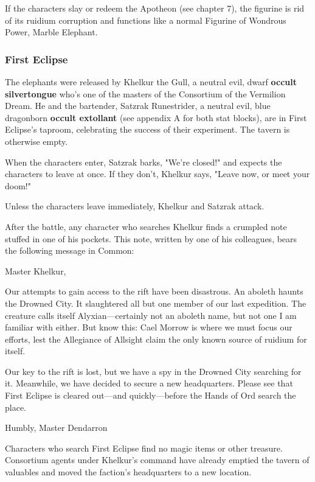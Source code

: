 \documentclass[10pt,a4paper,twoside,fancy,bg=print,twocolumn,openany,nodeprecatedcode]{dndbook}
\begin{document}
If the characters slay or redeem the Apotheon (see chapter 7), the figurine is rid of its ruidium corruption and functions like a normal Figurine of Wondrous Power, Marble Elephant.

\subsubsection{First Eclipse}
The elephants were released by Khelkur the Gull, a neutral evil, dwarf \textbf{occult silvertongue} who's one of the masters of the Consortium of the Vermilion Dream. He and the bartender, Satzrak Runestrider, a neutral evil, blue dragonborn \textbf{occult extollant} (see appendix A for both stat blocks), are in First Eclipse's taproom, celebrating the success of their experiment. The tavern is otherwise empty.

When the characters enter, Satzrak barks, "We're closed!" and expects the characters to leave at once. If they don't, Khelkur says, "Leave now, or meet your doom!"

Unless the characters leave immediately, Khelkur and Satzrak attack.

After the battle, any character who searches Khelkur finds a crumpled note stuffed in one of his pockets. This note, written by one of his colleagues, bears the following message in Common:

\begin{DndReadAloud}{}
Master Khelkur,

Our attempts to gain access to the rift have been disastrous. An aboleth haunts the Drowned City. It slaughtered all but one member of our last expedition. The creature calls itself Alyxian—certainly not an aboleth name, but not one I am familiar with either. But know this: Cael Morrow is where we must focus our efforts, lest the Allegiance of Allsight claim the only known source of ruidium for itself.

Our key to the rift is lost, but we have a spy in the Drowned City searching for it. Meanwhile, we have decided to secure a new headquarters. Please see that First Eclipse is cleared out—and quickly—before the Hands of Ord search the place.

Humbly, Master Dendarron

\end{DndReadAloud}

Characters who search First Eclipse find no magic items or other treasure. Consortium agents under Khelkur's command have already emptied the tavern of valuables and moved the faction's headquarters to a new location.
\end{document}
